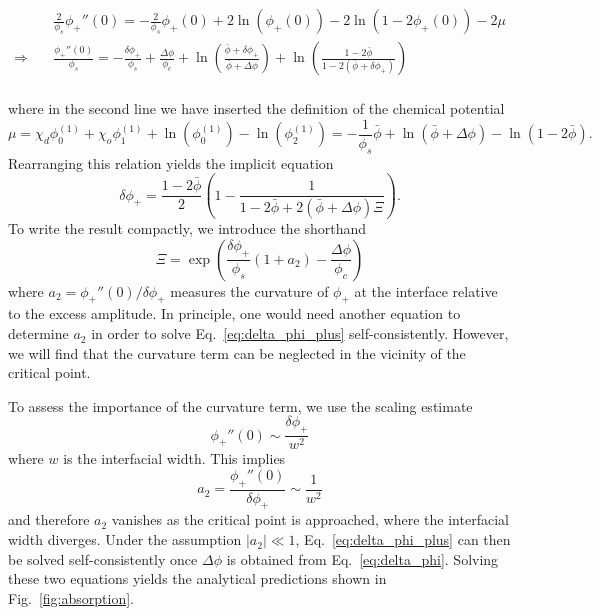 \documentclass[12pt]{article}
\begin{document}
\[
\begin{aligned}
    &\frac{2}{\phi_s} \phi_+''(0) = -\frac{2}{\phi_s}\phi_+(0) + 2\ln(\phi_+(0)) - 2 \ln(1-2\phi_+(0)) - 2\mu \\
    \Rightarrow\quad&\frac{ \phi_+''(0)}{\phi_s} = -\frac{\delta\phi_+}{\phi_s} + \frac{\Delta\phi}{\phi_c} + \ln\left(\frac{\bar\phi+\delta\phi_+}{\bar\phi+\Delta\phi}\right)+\ln\left(\frac{1-2\bar\phi}{1-2(\bar\phi+\delta\phi_+)}\right) \\
\end{aligned}
\]

where in the second line we have inserted the definition of the chemical potential
\[
\mu = \chi_d\phi_0^{(1)} + \chi_o \phi_1^{(1)} + \ln(\phi_0^{(1)}) - \ln(\phi_2^{(1)}) = -\frac{1}{\phi_s}\bar\phi + \ln(\bar\phi+\Delta\phi) -  \ln(1-2\bar\phi).
\]
Rearranging this relation yields the implicit equation
\begin{equation}
    \delta \phi_+ =\frac{1-2\bar\phi}{2}\left(1- \frac{1}{1-2\bar\phi+2(\bar\phi+\Delta\phi)\Xi}\right).
    \label{eq:delta_phi_plus}
\end{equation}
To write the result compactly, we introduce the shorthand
\begin{equation}
    \Xi = \exp\left(\frac{\delta \phi_+}{\phi_s}(1+a_2) - \frac{\Delta \phi}{\phi_c}\right)
\end{equation}
where \(a_2 = \phi_+''(0)/\delta\phi_+\) measures the curvature of \(\phi_+\) at the interface relative to the excess amplitude.
In principle, one would need another equation to determine \(a_2\) in order to solve Eq.~\eqref{eq:delta_phi_plus} self-consistently.
However, we will find that the curvature term can be neglected in the vicinity of the critical point.

To assess the importance of the curvature term, we use the scaling estimate
\[
\phi_+''(0) \sim \frac{\delta\phi_+}{w^2} 
\]
where \(w\) is the interfacial width.
This implies
\[
a_2 = \frac{\phi_+''(0)}{\delta\phi_+} \sim \frac{1}{w^2}
\]
and therefore \(a_2\) vanishes as the critical point is approached, where the interfacial width diverges. Under the assumption $|a_2| \ll 1$, Eq.~\eqref{eq:delta_phi_plus} can then be solved self-consistently once \(\Delta \phi\) is obtained from Eq.~\eqref{eq:delta_phi}. Solving these two equations yields the analytical predictions shown in Fig.~\ref{fig:absorption}.\\
\end{document}
